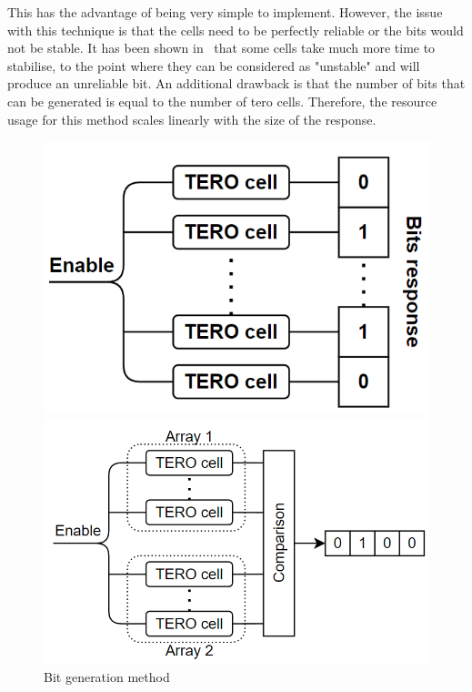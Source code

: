 This has the advantage of being very simple to implement. However, the issue with this technique is that the cells need to be perfectly reliable or the bits would not be stable. It has been shown in~\cite{bossuet_puf_2014, marchand_implementation_2017} that some cells take much more time to stabilise, to the point where they can be considered as "unstable" and will produce an unreliable bit. An additional drawback is that the number of bits that can be generated is equal to the number of \acrshort{tero} cells. Therefore, the resource usage for this method scales linearly with the size of the response. \\



\begin{figure}[H]
   \begin{minipage}[b]{0.47\linewidth} 
        \centering
        \includegraphics[width=\linewidth]{images/generative_meth_1.png}
   \end{minipage}\hfill
   \begin{minipage}[b]{0.53\linewidth}   
        \centering
        \includegraphics[width=\linewidth]{images/generative_meth_2.png}
   \end{minipage}
   \caption{Bit generation method}
\end{figure}


